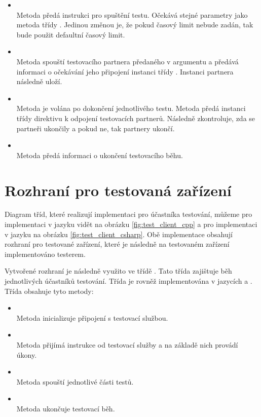 \begin{itemize}
    \item {} \\ Metoda předá instrukci pro spuštění testu. Očekává stejné parametry jako metoda  třídy . Jedinou změnou je, že pokud časový limit nebude zadán, tak bude použit defaultní časový limit.
    \item {} \\ Metoda spouští testovacího partnera předaného v argumentu a předává informaci o očekávání jeho připojení  instanci třídy . Instanci partnera následně uloží.
    \item {} \\ Metoda je volána po dokončení jednotlivého testu. Metoda předá instanci třídy  direktivu k odpojení testovacích partnerů. Následně zkontroluje, zda se partneři ukončily a pokud ne, tak partnery ukončí.
    \item {} \\ Metoda předá informaci o ukončení testovacího běhu.
\end{itemize}

\section{Rozhraní pro testovaná zařízení}\label{sec:testrunner}

Diagram tříd, které realizují implementaci pro účastníka testování, můžeme pro implementaci v jazyku \cpp{} vidět na obrázku \ref{fig:test_client_cpp} a pro implementaci v jazyku \csharp{} na obrázku \ref{fig:test_client_csharp}. Obě implementace obsahují rozhraní pro testované zařízení, které je následně na testovaném zařízení implementováno testerem.

Vytvořené rozhraní je následně využito ve třídě . Tato třída zajištuje běh jednotlivých účastníků testování. Třída je rovněž implementována v jazycích \csharp{} a \cpp{}. Třída obsahuje tyto metody: 

\begin{itemize}
    \item {} \\ Metoda inicializuje připojení s testovací službou.
    \item {} \\ Metoda přijímá instrukce od testovací služby a na základě nich provádí úkony.
    \item {} \\ Metoda spouští jednotlivé části testů. 
    \item {} \\ Metoda ukončuje testovací běh.
\end{itemize}

